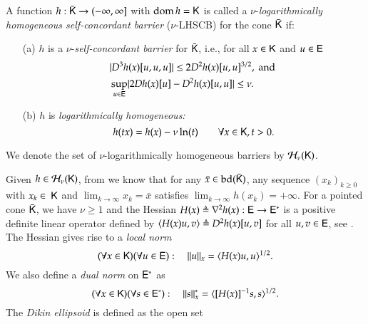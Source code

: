 \begin{definition}
\label{def:LHSCB}
A function $h:\bar{\mathsf{K}}\to(-\infty,\infty]$ with $\operatorname{dom} h=\mathsf{K}$ is called a $\nu$-\emph{logarithmically homogeneous self-concordant barrier} ($\nu$-LHSCB) for the cone $\bar{\mathsf{K}}$ if:
\begin{itemize}
\item[(a)] $h$ is a $\nu$-\emph{self-concordant barrier} for $\bar{\mathsf{K}}$, i.e., for all $x \in \mathsf{K}$ and $u\in \mathsf{E}$
\begin{align}
\label{eq:SC}
&\lvert D^{3}h(x)[u,u,u]\rvert\leq 2D^{2}h(x)[u,u]^{3/2},\text{ and } \\
&\sup_{u\in\mathsf{E}}\lvert2 Dh(x)[u]-D^{2}h(x)[u,u]\rvert\leq \nu.
\end{align}
\item[(b)] $h$ is \emph{logarithmically homogeneous:} 
\[
h(tx)=h(x)-\nu\ln(t)\qquad \forall x\in \mathsf{K},t>0.
\]
\end{itemize}
We denote the set of $\nu$-logarithmically homogeneous barriers by $\mathcal{H}_{\nu}(\mathsf{K})$.
\end{definition}
Given $h\in\mathcal{H}_{\nu}(\mathsf{K})$, from \cite[Thm 5.1.3]{Nes18} we know that for any $\bar{x}\in\operatorname{bd}(\bar{\mathsf{K}})$, any sequence $(x_{k})_{k \geq 0}$ with $x_{k}\in\ \mathsf{K}$ and $\lim_{k\to\infty}x_{k}=\bar{x}$ satisfies $\lim_{k\to\infty}h(x_{k})=+\infty$. For a pointed cone $\bar{\mathsf{K}}$, we have $\nu\geq 1$ and the Hessian $H(x)\triangleq\nabla^{2}h(x):\mathsf{E}\to\mathsf{E}^{\ast}$ is a positive definite linear operator defined by $\langle H(x)u,v\rangle\triangleq D^{2}h(x)[u,v]$ for all $u,v\in\mathsf{E}$, see  \cite[Thm. 5.1.6]{Nes18}. The Hessian gives rise to a \emph{local norm} 
\begin{equation}\label{eq:localnorm}
(\forall x\in \mathsf{K})(\forall u\in\mathsf{E}):\quad \lVert u\rVert_{x}=\langle H(x)u,u\rangle^{1/2}.
\end{equation}
We also define a \emph{dual norm} on $\mathsf{E}^{\ast}$ as 
\begin{equation}\label{eq:dualnorm}
(\forall x\in\mathsf{K})(\forall s\in\mathsf{E}^{\ast}):\quad \lVert s\rVert_{x}^{\ast}= \langle[H(x)]^{-1}s,s\rangle^{1/2}.
\end{equation}
The \emph{Dikin ellipsoid} is defined as the open set
